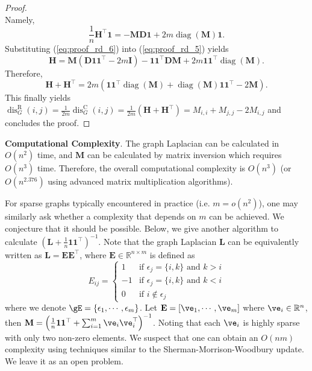 \documentclass{article} %
\newcommand*{\disR}{\operatorname{dis}^\mathrm{R}}
\newcommand*{\disC}{\operatorname{dis}^\mathrm{C}}
\newcommand*{\diag}{\operatorname{diag}}
\begin{document}
\begin{proof}
\begin{equation}
\end{equation}
Namely, 
\begin{equation}
\label{eq:proof_rd_6}
    \frac 1 n \mathbf H^\top\mathbf 1=-\mathbf M\mathbf D\mathbf 1+2m\diag\left(\mathbf M\right)\mathbf 1.
\end{equation}
Substituting (\ref{eq:proof_rd_6}) into (\ref{eq:proof_rd_5}) yields
\begin{equation}
    \mathbf H=\mathbf M\left(\mathbf D\mathbf 1\mathbf 1^\top-2m\mathbf I\right)-\mathbf 1\mathbf 1^\top\mathbf D\mathbf M +2m\mathbf 1\mathbf 1^\top\diag\left(\mathbf M\right).
\end{equation}
Therefore,
\begin{equation}
    \mathbf H+\mathbf H^\top=2m(\mathbf 1\mathbf 1^\top\diag\left(\mathbf M\right)+\diag\left(\mathbf M\right)\mathbf 1\mathbf 1^\top-2\mathbf M).
\end{equation}
This finally yields $\disR_G(i,j)=\frac 1 {2m} \disC_G(i,j)=\frac 1 {2m}(\mathbf H+\mathbf H^\top)=M_{i,i}+M_{j,j}-2M_{i,j}$ and concludes the proof.
\end{proof}

\textbf{Computational Complexity}. The graph Laplacian can be calculated in $O(n^2)$ time, and $\mathbf M$ can be calculated by matrix inversion which requires $O(n^3)$ time. Therefore, the overall computational complexity is $O(n^3)$ (or $O(n^{2.376})$ using advanced matrix multiplication algorithms).

For sparse graphs typically encountered in practice (i.e. $m=o(n^2)$), one may similarly ask whether a complexity that depends on $m$ can be achieved. We conjecture that it should be possible. Below, we give another algorithm to calculate $\left(\mathbf L+\frac 1 n \mathbf 1\mathbf 1^\top\right)^{-1}$. Note that the graph Laplacian $\mathbf L$ can be equivalently written as $\mathbf L=\mathbf E\mathbf E^\top$, where $\mathbf E\in\mathbb R^{n\times m}$ is defined as
\begin{equation}
    E_{ij}=\left\{\begin{array}{ll}
        1 &  \text{if }\epsilon_j=\{i,k\} \text{ and } k>i \\
        -1 & \text{if }\epsilon_j=\{i,k\} \text{ and } k<i \\
        0 &  \text{if }i\notin \epsilon_j
    \end{array}\right.
\end{equation}
where we denote $\gE=\{\epsilon_1,\cdots,\epsilon_m\}$. Let $\mathbf E=[\ve_1,\cdots,\ve_m]$ where $\ve_i\in\mathbb R^n$, then $\mathbf M=\left(\frac 1 n\mathbf 1\mathbf 1^\top+\sum_{i=1}^m \ve_i\ve_i^\top\right)^{-1}$. Noting that each $\ve_i$ is highly sparse with only two non-zero elements. We suspect that one can obtain an $O(nm)$ complexity using techniques similar to the Sherman-Morrison-Woodbury update. We leave it as an open problem.
\end{document}
